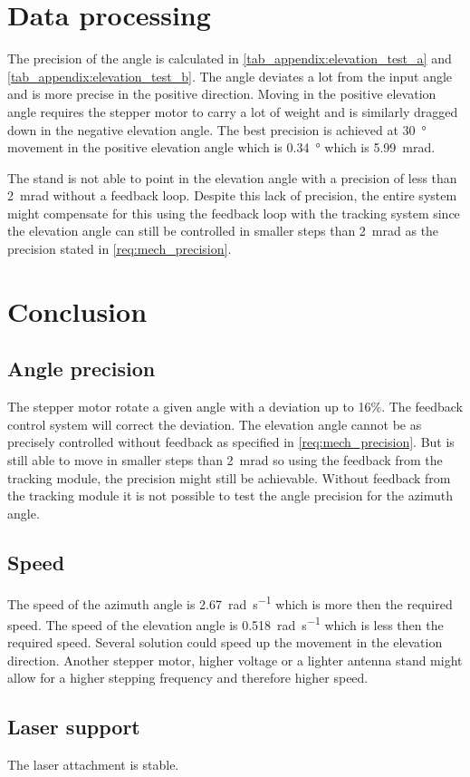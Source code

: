 \section*{Data processing}
The precision  of the angle is calculated in \autoref{tab_appendix:elevation_test_a} and  \autoref{tab_appendix:elevation_test_b}. The angle deviates a lot from the input angle and is more precise in the positive direction. Moving in the positive elevation angle requires the stepper motor to carry a lot of weight and is similarly dragged down in the negative elevation angle.
The best precision is achieved at \SI{30}{\degree} movement in the positive elevation angle which is \SI{0.34}{\degree} which is \SI{5.99}{\milli\radian}.

The stand is not able to point in the elevation angle with a precision of less than \SI{2}{\milli\radian} without a feedback loop. Despite this lack of precision, the entire system might compensate for this using the feedback loop with the tracking system since the elevation angle can still be controlled in smaller steps than \SI{2}{\milli\radian} as the precision stated in \autoref{req:mech_precision}.


\section*{Conclusion}
\subsection*{Angle precision}
The stepper motor rotate a given angle with a deviation up to 16\%. The feedback control system will correct the deviation. The elevation angle cannot be as precisely controlled without feedback as specified in \autoref{req:mech_precision}.
But is still able to move in smaller steps than \SI{2}{\milli\radian} so using the feedback from the tracking module, the precision might still be achievable. Without feedback from the tracking module it is not possible to test the angle precision for the azimuth angle. 

\subsection*{Speed}
The speed of the azimuth angle is \SI{2.67}{\radian\per\second} which is more then the required speed. The speed of the elevation angle is \SI{0.518}{\radian\per\second} which is less then the required speed. Several solution could speed up the movement in the elevation direction. Another stepper motor, higher voltage or a lighter antenna stand might allow for a higher stepping frequency and therefore higher speed.

\subsection*{Laser support}
The laser attachment is stable.

